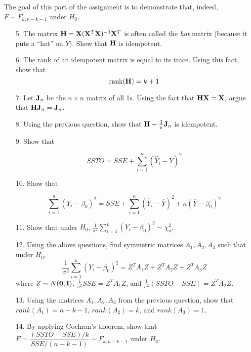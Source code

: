 \documentclass[11pt]{article}
\begin{document}
\noindent The goal of this part of the assignment is to demonstrate that, indeed, $F \sim F_{k, n-k-1}$ under $H_0$.

\begin{enumerate}

\item[5.] The matrix ${\bf H} = {\bf X}({\bf X}^T{\bf X})^{-1} {\bf X}^T$ is often called the \textit{hat} matrix (because it puts a ``hat'' on $Y$). Show that ${\bf H}$ is idempotent.

\item[6.] The rank of an idempotent matrix is equal to its trace. Using this fact, show that 
$$\text{rank}({\bf H}) = k+1$$

\item[7.] Let ${\bf J}_n$ be the $n \times n$ matrix of all 1s. Using the fact that ${\bf H} {\bf X} = {\bf X}$, argue that ${\bf H} {\bf J}_n = {\bf J}_n$.

\item[8.] Using the previous question, show that ${\bf H} - \frac{1}{n} {\bf J}_n$ is idempotent.

\item[9.] Show that

$$SSTO = SSE + \sum \limits_{i=1}^n (\widehat{Y}_i - \overline{Y})^2$$

\item[10.] Show that

$$\sum \limits_{i=1}^n (Y_i - \beta_0)^2 = SSE + \sum \limits_{i=1}^n (\widehat{Y}_i - \overline{Y})^2 + n (\overline{Y} - \beta_0)^2$$


\item[11.] Show that under $H_0$, $\frac{1}{\sigma^2}\sum \limits_{i=1}^n (Y_i - \beta_0)^2 \sim \chi^2_n$.

\item[12.] Using the above questions, find symmetric matrices $A_1, A_2, A_3$ such that under $H_0$, 
$$\frac{1}{\sigma^2}\sum \limits_{i=1}^n (Y_i - \beta_0)^2 = Z^T A_1 Z + Z^T A_2 Z + Z^T A_3 Z$$
where $Z \sim N(\bm{0}, {\bf I})$, $\frac{1}{\sigma^2} SSE = Z^T A_1 Z$, and $\frac{1}{\sigma^2} (SSTO - SSE) = Z^T A_2 Z$.

\item[13.] Using the matrices $A_1, A_2, A_3$ from the previous question, show that $rank(A_1) = n-k-1$, $rank(A_2) = k$, and $rank(A_3) = 1$.

\item[14.] By applying Cochran's theorem, show that $F = \dfrac{(SSTO - SSE)/k}{SSE/(n - k - 1)} \sim F_{k, n-k-1}$ under $H_0$.
\end{enumerate}
\end{document}
